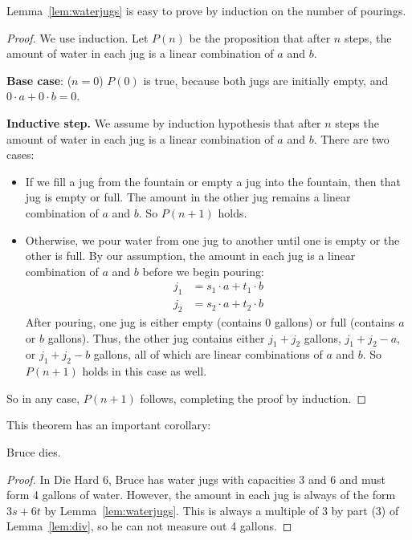 Lemma~\ref{lem:waterjugs} is easy to prove by induction on the number of
pourings.

\begin{proof}
We use induction.  Let $P(n)$ be the proposition that after $n$ steps,
the amount of water in each jug is a linear combination of $a$ and
$b$.

\noindent \textbf{Base case}: ($n = 0$)  $P(0)$ is true, because both jugs are
initially empty, and $0 \cdot a + 0 \cdot b = 0$.

\noindent \textbf{Inductive step.}  We assume by induction hypothesis that
after $n$ steps the amount of water in each jug is a linear combination of
$a$ and $b$.  There are two cases:
%
\begin{itemize}
%
\item If we fill a jug from the fountain or empty a jug into the
fountain, then that jug is empty or full.  The amount in the other jug
remains a linear combination of $a$ and $b$.  So $P(n+1)$ holds.

\item Otherwise, we pour water from one jug to another until one is
empty or the other is full.  By our assumption, the amount in each jug
is a linear combination of $a$ and $b$ before we begin pouring:
%
\begin{align*}
j_1 & = s_1 \cdot a + t_1 \cdot b \\
j_2 & = s_2 \cdot a + t_2 \cdot b
\end{align*}
%
After pouring, one jug is either empty (contains 0 gallons) or full
(contains $a$ or $b$ gallons).  Thus, the other jug contains either
$j_1 + j_2$ gallons, $j_1 + j_2 - a$, or $j_1 + j_2 - b$ gallons, all
of which are linear combinations of $a$ and $b$.  So $P(n+1)$ holds in
this case as well.
\end{itemize}
%
So in any case,  $P(n+1)$ follows, completing the proof by induction.
\end{proof}

This theorem has an important corollary:
\begin{corollary}
Bruce dies.
\end{corollary}

\begin{proof}
In Die Hard 6, Bruce has water jugs with capacities 3 and 6 and must
form 4 gallons of water.  However, the amount in each jug is always of
the form $3s + 6t$ by Lemma~\ref{lem:waterjugs}.  This is always a
multiple of 3 by part (3) of Lemma~\ref{lem:div}, so he can not
measure out 4 gallons.
\end{proof}

